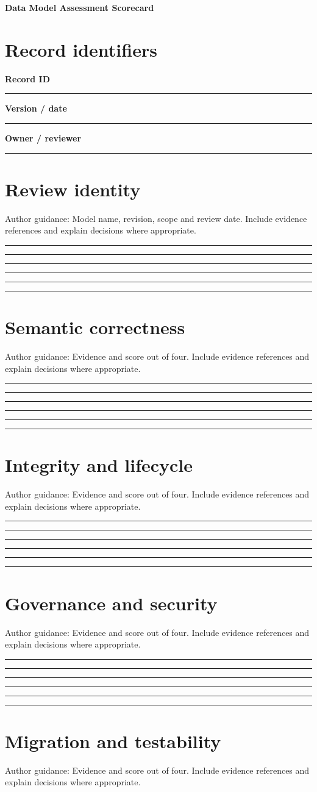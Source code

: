 \documentclass[11pt,letterpaper]{article}
\newcommand{\ResponseLine}{\par\vspace{1.05em}\noindent\rule{\linewidth}{0.4pt}\par}
\newcommand{\ResponseArea}{\ResponseLine\ResponseLine\ResponseLine}
\begin{document}
\begin{center}
{\LARGE\bfseries\color{navy} Data Model Assessment Scorecard}\par
\vspace{0.25em}{\large Authoring Template | guided fields}\par
{}
\end{center}
\vspace{0.8em}
\section{Record identifiers}
\textbf{Record ID}\ResponseLine\textbf{Version / date}\ResponseLine\textbf{Owner / reviewer}\ResponseLine
\section{Review identity}
Author guidance: Model name, revision, scope and review date. Include evidence references and explain decisions where appropriate.


\ResponseArea\ResponseArea
\section{Semantic correctness}
Author guidance: Evidence and score out of four. Include evidence references and explain decisions where appropriate.


\ResponseArea\ResponseArea
\section{Integrity and lifecycle}
Author guidance: Evidence and score out of four. Include evidence references and explain decisions where appropriate.


\ResponseArea\ResponseArea
\section{Governance and security}
Author guidance: Evidence and score out of four. Include evidence references and explain decisions where appropriate.


\ResponseArea\ResponseArea
\section{Migration and testability}
Author guidance: Evidence and score out of four. Include evidence references and explain decisions where appropriate.
\end{document}
